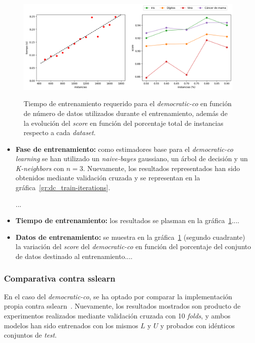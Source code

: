 \begin{figure}[h]
	\caption[\textit{Democratic-co}: resultados experimentación (tiempo-porcentaje)]{Tiempo de entrenamiento requerido para el \textit{democratic-co} en función de número de datos utilizados durante el entrenamiento, además de la evolución del \textit{score} en función del porcentaje total de instancias respecto a cada \textit{dataset}.}
	\centering
	\includegraphics[scale=0.4]{../img/memoria/5_tritraining_time-percentage}
	\label{gr:dc_time-percentage}
\end{figure}

\begin{itemize}
	\item \textbf{Fase de entrenamiento:} como estimadores base para el \textit{democratic-co learning} se han utilizado un \textit{naive-bayes} gaussiano, un árbol de decisión y un \textit{K-neighbors} con $n = 3$. Nuevamente, los resultados representados han sido obtenidos mediante validación cruzada y se representan en la gráfica~\ref{gr:dc_train-iterations}.
	
	...
	
	
	\item \textbf{Tiempo de entrenamiento:} los resultados se plasman en la gráfica~\ref{gr:dc_time-percentage}....
	
	\item \textbf{Datos de entrenamiento:} se muestra en la gráfica~\ref{gr:dc_time-percentage} (segundo cuadrante) la variación del \textit{score} del \textit{democratic-co} en función del porcentaje del conjunto de datos destinado al entrenamiento....
\end{itemize} 


\subsubsection{Comparativa contra sslearn}

En el caso del \textit{democratic-co}, se ha optado por comparar la implementación propia contra sslearn~\cite{sslearnRepo}. Nuevamente, los resultados mostrados son producto de experimentos realizados mediante validación cruzada con 10 \textit{folds}, y ambos modelos han sido entrenados con los mismos $L$ y $U$ y probados con idénticos conjuntos de \textit{test}.

